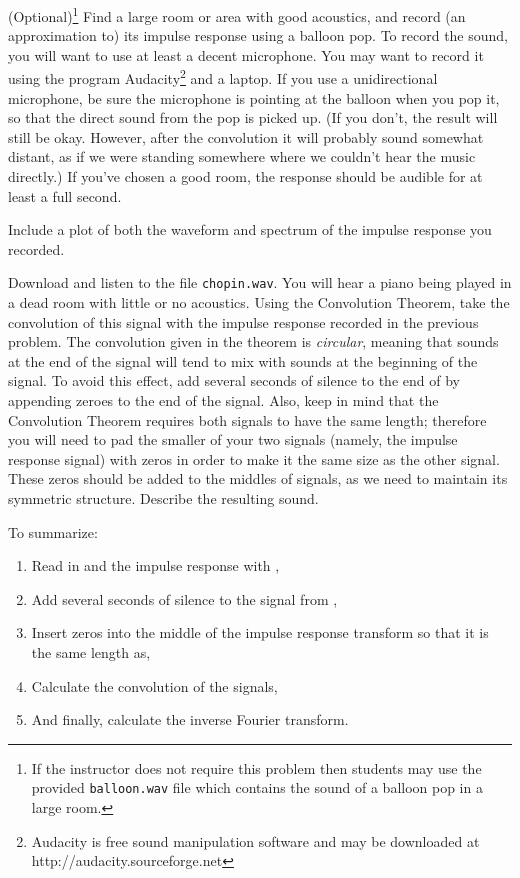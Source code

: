 \begin{problem}
(Optional)\footnote{If the instructor does not require this problem then students may use the provided \texttt{balloon.wav} file which contains the sound of a balloon pop in a large room.} Find a large room or area with good acoustics, and record (an approximation to) its impulse response using a balloon pop.
To record the sound, you will want to use at least a decent microphone.
You may want to record it using the program Audacity\footnote{Audacity is free sound manipulation software and may be downloaded at http://audacity.sourceforge.net} and a laptop.
If you use a unidirectional microphone, be sure the microphone is pointing at the balloon when you pop it, so that the direct sound from the pop is picked up.
(If you don't, the result will still be okay.
However, after the convolution it will probably sound somewhat distant, as if we were standing somewhere where we couldn't hear the music directly.)
If you've chosen a good room, the response should be audible for at least a full second.

Include a plot of both the waveform and spectrum of the impulse response you recorded.
\end{problem}

\begin{problem}\label{convolution_problem}
Download and listen to the file \texttt{chopin.wav}.
You will hear a piano being played in a dead room with little or no acoustics.
Using the Convolution Theorem, take the convolution of this signal with the impulse response recorded in the previous problem.
The convolution given in the theorem is \emph{circular}, meaning that sounds at the end of the signal will tend to mix with sounds at the beginning of the signal.
To avoid this effect, add several seconds of silence to the end of  by appending zeroes to the end of the signal.
Also, keep in mind that the Convolution Theorem requires both signals to have the same length; therefore you will need to pad the smaller of your two signals (namely, the impulse response signal) with zeros in order to make it the same size as the other signal.
These zeros should be added to the middles of signals, as we need to maintain its symmetric structure.
Describe the resulting sound.

To summarize:
\begin{enumerate}

\item Read in  and the impulse response with , 
\item Add several seconds of silence to the signal from ,
\item Insert zeros into the middle of the impulse response transform so that it is the same length as, 
\item Calculate the convolution of the signals,
\item And finally, calculate the inverse Fourier transform.
\end{enumerate}

\end{problem}

